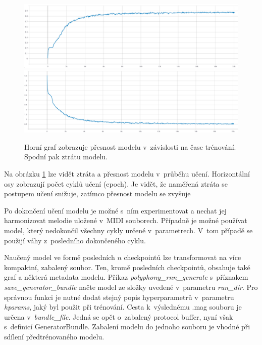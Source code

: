 \begin{figure}[h]\centering
    \centering
    \includegraphics[width=1\linewidth]{obrazky/AccuracyEpoch.png}\\[1pt]  
    \includegraphics[width=1\linewidth]{obrazky/LossEpoch.png}\\[1pt]  
    \caption{Horní graf zobrazuje přesnost modelu v~závislosti na čase trénování.
    Spodní pak ztrátu modelu.}    
    \label{obrazekaccuracyLossPerEpoch}
\end{figure}

Na obrázku \ref{obrazekaccuracyLossPerEpoch} lze vidět ztráta a přesnost modelu v~průběhu učení.
Horizontální osy zobrazují počet cyklů učení (epoch).
Je vidět, že naměřená ztráta se postupem učení snižuje, 
zatímco přesnost modelu se zvyšuje

Po dokončení učení modelu je možné s~ním experimentovat 
a nechat jej harmonizovat melodie uložené v~MIDI souborech.
Případně je možné používat model, který nedokončil všechny cykly určené v~parametrech.
V~tom případě se použijí váhy z~posledního dokončeného cyklu.
\par
Naučený model ve formě posledních $n$ checkpointů lze transformovat
na více kompaktní, zabalený soubor.
Ten, kromě posledních checkpointů, obsahuje také graf a některá metadata modelu.
Příkaz \emph{polyphony\_rnn\_generate} s~příznakem \emph{save\_generator\_bundle}
načte model ze složky uvedené v~parametru \emph{run\_dir}.
Pro správnou funkci je nutné dodat stejný popis hyperparametrů v~parametru \emph{hparams}, 
jaký byl použit při trénování.
Cesta k~výslednému .mag souboru je určena v~\emph{bundle\_file}.
Jedná se opět o~zabalený protocol buffer, nyní však s~definicí GeneratorBundle.
Zabalení modelu do jednoho souboru je vhodné při sdílení předtrénovaného modelu.
\cite{google_git_polyphony}

